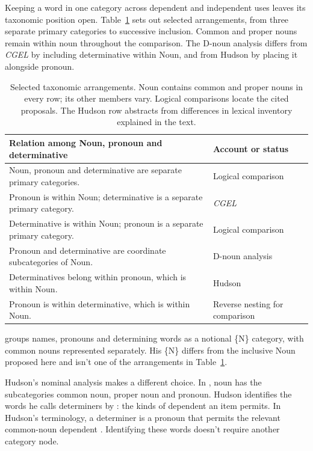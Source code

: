\documentclass[12pt]{article}
\begin{document}
Keeping a word in one category across dependent and independent uses leaves its taxonomic position open. Table~\ref{tab:rivals} sets out selected arrangements, from three separate primary categories to successive inclusion. Common and proper nouns remain within noun throughout the comparison. The D-noun analysis differs from \textit{CGEL} by including determinative within Noun, and from Hudson by placing it alongside pronoun.

\begin{table}[tb]
\centering\small
\caption{Selected taxonomic arrangements. Noun contains common and proper nouns in every row; its other members vary. Logical comparisons locate the cited proposals. The Hudson row abstracts from differences in lexical inventory explained in the text.}\label{tab:rivals}
\begin{tabular}{>{\raggedright\arraybackslash}p{8.7cm}>{\raggedright\arraybackslash}p{3cm}}
\toprule
Relation among Noun, pronoun and determinative & Account or status \\
\midrule
Noun, pronoun and determinative are separate primary categories. & Logical comparison \\
Pronoun is within Noun; determinative is a separate primary category. & \textit{CGEL} \\
Determinative is within Noun; pronoun is a separate primary category. & Logical comparison \\
Pronoun and determinative are coordinate subcategories of Noun. & D-noun analysis \\
Determinatives belong within pronoun, which is within Noun. & Hudson \\
Pronoun is within determinative, which is within Noun. & Reverse nesting for comparison \\
\bottomrule
\end{tabular}
\end{table}

\textcite{anderson1997notional} groups names, pronouns and determining words as a notional \{N\} category, with common nouns represented separately. His \{N\} differs from the inclusive Noun proposed here and isn't one of the arrangements in Table~\ref{tab:rivals}.

Hudson's nominal analysis makes a different choice. In \textcite[253--254]{hudson2010wordgrammar}, noun has the subcategories common noun, proper noun and pronoun. Hudson identifies the words he calls determiners by : the kinds of dependent an item permits. In Hudson's terminology, a determiner is a pronoun that permits the relevant common-noun dependent \citep[9--10]{hudson2004determiners}. Identifying these words doesn't require another category node.
\end{document}
